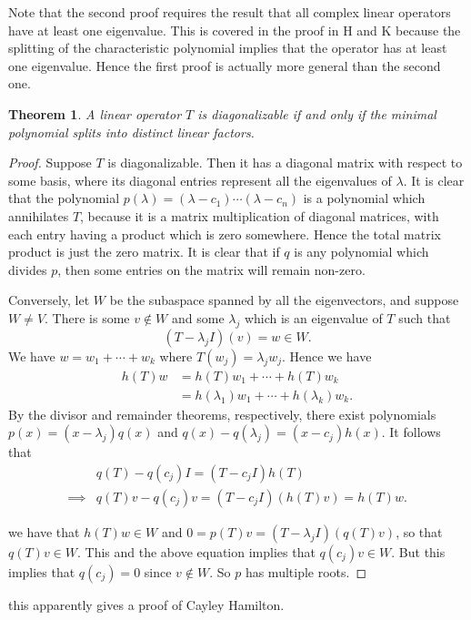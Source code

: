 \documentclass[12pt]{article}
\theoremstyle{plain}
\newtheorem{thm}{Theorem}
\theoremstyle{definition}
\begin{document}
Note that the second proof requires the result that all complex linear operators have at least one eigenvalue. This is covered in the proof in H and K because the splitting of the characteristic polynomial implies that the operator has at least one eigenvalue. Hence the first proof is actually more general than the second one.

\begin{thm}
A linear operator $T$ is diagonalizable if and only if the minimal polynomial splits into distinct linear factors.
\end{thm}
\begin{proof}
Suppose $T$ is diagonalizable. Then it has a diagonal matrix with respect to some basis, where its diagonal entries represent all the eigenvalues of $\lambda$. It is clear that the polynomial $p(\lambda) = (\lambda - c_1)\cdots(\lambda - c_n)$ is a polynomial which annihilates $T$, because it is a matrix multiplication of diagonal matrices, with each entry having a product which is zero somewhere. Hence the total matrix product is just the zero matrix. It is clear that if $q$ is any polynomial which divides $p$, then some entries on the matrix will remain non-zero.

Conversely, let $W$ be the subaspace spanned by all the eigenvectors, and suppose $W \neq V$. There is some $v \not\in W$ and some $\lambda_j$ which is an eigenvalue of $T$ such that 
\[(T - \lambda_j I)(v) = w \in W.\]
We have $w = w_1 + \cdots + w_k$ where $T(w_j) = \lambda_jw_j$. Hence we have
\begin{align*}
h(T)w &= h(T)w_1 + \cdots + h(T)w_k \\
		 &= h(\lambda_1)w_1 + \cdots + h(\lambda_k)w_k.
\end{align*}
By the divisor and remainder theorems, respectively, there exist polynomials $p(x) = (x - \lambda_j)q(x)$ and $q(x) - q(\lambda_j) = (x - c_j)h(x)$. It follows that
\begin{align*}
& q(T) - q(c_j)I = (T - c_jI)h(T) \\
		\implies & q(T)v - q(c_j)v = (T - c_jI)(h(T)v) = h(T)w.
\end{align*}

we have that $h(T)w \in W$ and $0 = p(T)v = (T - \lambda_j I)(q(T)v)$, so that $q(T)v \in W$. This and the above equation implies that $q(c_j)v \in W$. But this implies that $q(c_j) = 0$ since $v \not\in W$. So $p$ has multiple roots.
\end{proof}

this apparently gives a proof of Cayley Hamilton.
\end{document}
